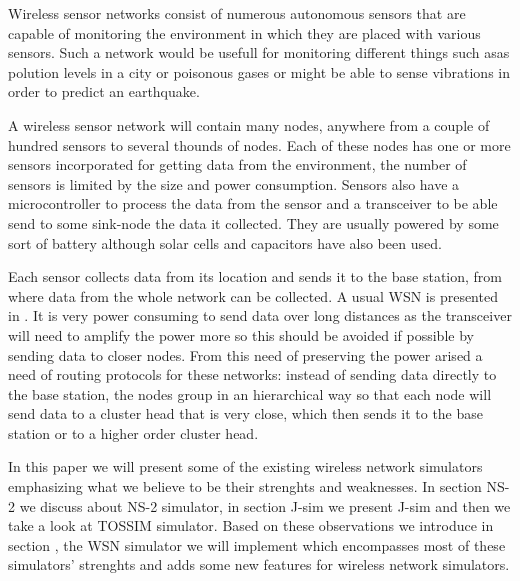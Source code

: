 
Wireless sensor networks consist of numerous autonomous sensors that are
capable of monitoring the environment in which they are placed with various
sensors. Such a network would be usefull for monitoring different things such
asas polution levels
in a city or poisonous gases or might be able to sense vibrations in order 
to predict an earthquake. 

A wireless sensor network will contain many nodes, anywhere from a couple of
hundred sensors to several thounds of nodes. Each of these nodes has one or
more sensors incorporated for getting data from the environment, the number of
sensors is limited
by the size and power consumption. Sensors also have a microcontroller 
to process the data from the sensor and a transceiver to be able send to some 
sink-node the data it collected. They are usually powered by some sort of battery 
although solar cells and capacitors have also been used.

Each sensor collects data from its location and sends it to the base station,
from where data from the whole network can be collected. A usual WSN is
presented in . It is very power
consuming to send data over long distances as the transceiver will need to
amplify the power more so this should be avoided if possible by sending data to
closer nodes. From this need of preserving the power 
arised a need of routing protocols for these
networks: instead of sending data directly to the base station, the nodes
group in an hierarchical way so that each node will send data to a cluster
head that is very close, which then sends it to the base station or to a higher
order cluster head.


In this paper we will present some of the existing wireless network
simulators emphasizing what we believe to be their strenghts and weaknesses. 
In section NS-2 we discuss about NS-2 simulator, in section J-sim we present
J-sim and then we take a look at TOSSIM simulator. Based on these observations
we introduce in section \codename, the WSN simulator we will implement which
encompasses most of these simulators' strenghts and adds some new features
for wireless network simulators.
